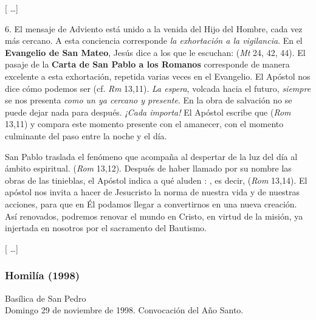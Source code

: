 \begin{body}
\begin{body}
		{[} \ldots{}{]}
		
		6. El mensaje de Adviento está unido a la venida del Hijo del Hombre, cada vez más cercano. A esta conciencia corresponde \emph{la exhortación a la vigilancia}. En el \textbf{Evangelio de San Mateo}, Jesús dice a los que le escuchan:  (\emph{Mt} 24, 42, 44). El pasaje de la \textbf{Carta de San Pablo a los Romanos} corresponde de manera excelente a esta exhortación, repetida varias veces en el Evangelio. El Apóstol nos dice cómo podemos ser  (cf. \emph{Rm} 13,11). \emph{La espera}, volcada hacia el futuro, \emph{siempre} se nos presenta \emph{como un  ya cercano y presente}. En la obra de salvación no se puede dejar nada para después. \emph{¡Cada  importa!} El Apóstol escribe que  (\emph{Rom} 13,11) y compara este momento presente con el amanecer, con el momento culminante del paso entre la noche y el día.
		
		San Pablo traslada el fenómeno que acompaña al despertar de la luz del día al ámbito espiritual.  (\emph{Rom} 13,12). Después de haber llamado por su nombre las obras de las tinieblas, el Apóstol indica a qué aluden : , es decir,  (\emph{Rom} 13,14). El apóstol nos invita a hacer de Jesucristo la norma de nuestra vida y de nuestras acciones, para que en Él podamos llegar a convertirnos en una nueva creación. Así renovados, podremos renovar el mundo en Cristo, en virtud de la misión, ya injertada en nosotros por el sacramento del Bautismo.
		
		{[} \ldots{}{]}
	\end{body}

\subsubsection{Homilía (1998)}


Basílica de San Pedro\\ Domingo 29 de noviembre de 1998. Convocación del Año Santo.



\end{body}
